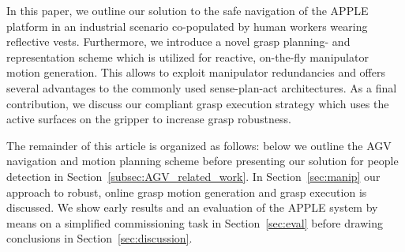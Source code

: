 In this paper, we outline our solution to the safe navigation of the APPLE platform in an industrial
scenario co-populated by human workers wearing reflective vests. Furthermore, we introduce a novel
grasp planning- and representation scheme which is utilized for reactive, on-the-fly manipulator
motion generation. This allows to exploit manipulator redundancies and offers several advantages to
the commonly used sense-plan-act architectures. As a final contribution, we discuss our compliant
grasp execution strategy which uses the active surfaces on the gripper to increase grasp robustness.

The remainder of this article is organized as follows: below we outline the AGV navigation and
motion planning scheme before presenting our solution for people detection in
Section~\ref{subsec:AGV_related_work}. In Section~\ref{sec:manip} our approach to robust, online
grasp motion generation and grasp execution is discussed. We show early results and an evaluation of
the APPLE system by means on a simplified commissioning task in Section~\ref{sec:eval} before
drawing conclusions in Section~\ref{sec:discussion}.
